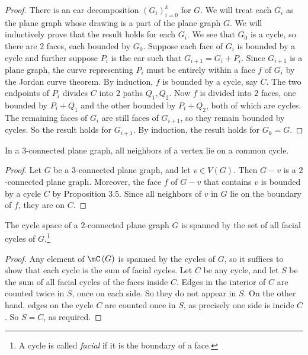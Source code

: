 \documentclass[co342]{subfiles}
\begin{document}
    \begin{proof}
        There is an ear decomposition $\left( G_{i} \right)^{k}_{i=0}$ for $G$. We will treat each $G_i$ as the plane graph whose drawing is a part of the plane graph $G$. We will inductively prove that the result holds for each $G_i$. We see that $G_0$ is a cycle, so there are $2$ faces, each bounded by $G_0$. Suppose each face of $G_i$ is bounded by a cycle and further suppose $P_i$ is the ear such that $G_{i+1}=G_i+P_i$. Since $G_{i+1}$ is a plane graph, the curve representing $P_i$ must be entirely within a face $f$ of $G_i$ by the Jordan curve theorem. By induction, $f$ is bounded by a cycle, say $C$. The two endpoints of $P_i$ divides $C$ into $2$ paths $Q_1,Q_2$. Now $f$ is divided into $2$ faces, one bounded by $P_i+Q_1$ and the other bounded by $P_i+Q_2$, both of which are cycles. The remaining faces of $G_i$ are still faces of $G_{i+1}$, so they remain bounded by cycles. So the result holds for $G_{i+1}$. By induction, the result holds for $G_k=G$.
    \end{proof}

    \begin{cor}{}
        In a $3$-connected plane graph, all neighbors of a vertex lie on a common cycle.
    \end{cor}	
    
    \begin{proof}
        Let $G$ be a $3$-connected plane graph, and let $v\in V\left( G \right)$. Then $G-v$ is a $2$-connected plane graph. Moreover, the face $f$ of $G-v$ that contains $v$ is bounded by a cycle $C$ by Proposition 3.5. Since all neighbors of $v$ in $G$ lie on the boundary of $f$, they are on $C$.
    \end{proof}
    
    \begin{prop}{}
        The cycle space of a $2$-connected plane graph $G$ is spanned by the set of all facial cycles of $G$.\footnote{A cycle is called \emph{facial} if it is the boundary of a face.}
    \end{prop}

    \begin{proof}
        Any element of $\mC\left( G \right)$ is spanned by the cycles of $G$, so it suffices to show that each cycle is the sum of facial cycles. Let $C$ be any cycle, and let $S$ be the sum of all facial cycles of the faces inside $C$. Edges in the interior of $C$ are counted twice in $S$, once on each side. So they do not appear in $S$. On the other hand, edges on the cycle $C$ are counted once in $S$, as precisely one side is incide $C$. So $S=C$, as required.
    \end{proof}
\end{document}
